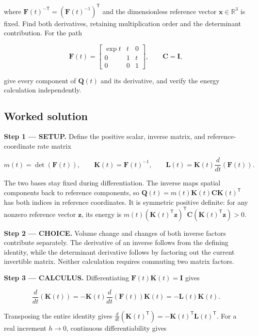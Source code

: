 \documentclass[11pt,oneside,openany]{book}
\begin{document}
where \(\mathbf F(t)^{-\mathsf T}=(\mathbf F(t)^{-1})^{\mathsf T}\) and the dimensionless reference vector \(\mathbf x\in\mathbb R^3\) is fixed. Find both derivatives, retaining multiplication order and the determinant contribution. For the path

\[
\mathbf F(t)=\begin{bmatrix}\exp t&t&0\\0&1&t\\0&0&1\end{bmatrix},\qquad
\mathbf C=\mathbf I,
\]

give every component of \(\mathbf Q(t)\) and its derivative, and verify the energy calculation independently.
\subsection*{Worked solution}

\textbf{Step 1 --- SETUP.} Define the positive scalar, inverse matrix, and reference-coordinate rate matrix

\[
m(t)=\det(\mathbf F(t)),\qquad
\mathbf K(t)=\mathbf F(t)^{-1},\qquad
\mathbf L(t)=\mathbf K(t)\frac{d}{dt}\left(\mathbf F(t)\right).
\]

The two bases stay fixed during differentiation. The inverse maps spatial components back to reference components, so \(\mathbf Q(t)=m(t)\mathbf K(t)\mathbf C\mathbf K(t)^{\mathsf T}\) has both indices in reference coordinates. It is symmetric positive definite: for any nonzero reference vector \(\mathbf z\), its energy is \(m(t)(\mathbf K(t)^{\mathsf T}\mathbf z)^{\mathsf T}\mathbf C(\mathbf K(t)^{\mathsf T}\mathbf z)>0\).

\begin{ChoiceStep}
\textbf{Step 2 --- CHOICE.} Volume change and changes of both inverse factors contribute separately. The derivative of an inverse follows from the defining identity, while the determinant derivative follows by factoring out the current invertible matrix. Neither calculation requires commuting two matrix factors.

\end{ChoiceStep}
\textbf{Step 3 --- CALCULUS.} Differentiating \(\mathbf F(t)\mathbf K(t)=\mathbf I\) gives

\[
\frac{d}{dt}\left(\mathbf K(t)\right)
=-\mathbf K(t)\frac{d}{dt}\left(\mathbf F(t)\right)\mathbf K(t)
=-\mathbf L(t)\mathbf K(t).
\]

Transposing the entire identity gives \(\frac{d}{dt}(\mathbf K(t)^{\mathsf T})=-\mathbf K(t)^{\mathsf T}\mathbf L(t)^{\mathsf T}\). For a real increment \(h\to0\), continuous differentiability gives
\end{document}
